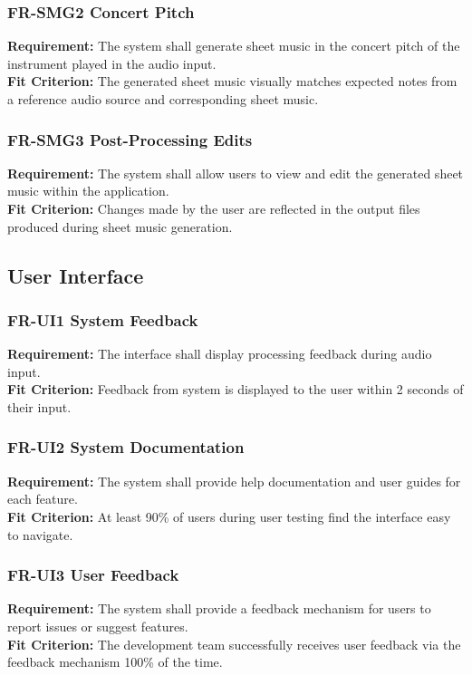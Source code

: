 \documentclass[12pt]{article}
\begin{document}
\subsubsection*{FR-SMG2 Concert Pitch} \label{FR-SMG2}
\textbf{Requirement:} The system shall generate sheet music in the concert pitch of the instrument played in the audio input. \\
\textbf{Fit Criterion:} The generated sheet music visually matches expected notes from a reference audio source and corresponding sheet music.
\subsubsection*{FR-SMG3 Post-Processing Edits} \label{FR-SMG3}
\textbf{Requirement:} The system shall allow users to view and edit the generated sheet music within the application. \\
\textbf{Fit Criterion:} Changes made by the user are reflected in the output files produced during sheet music generation.

\subsection{User Interface}
\subsubsection*{FR-UI1 System Feedback} \label{FR-UI1}
\textbf{Requirement:} The interface shall display processing feedback during audio input. \\
\textbf{Fit Criterion:} Feedback from system is displayed to the user within 2 seconds of their input.
\subsubsection*{FR-UI2 System Documentation} \label{FR-UI2}
\textbf{Requirement:} The system shall provide help documentation and user guides for each feature. \\
\textbf{Fit Criterion:} At least 90\% of users during user testing find the interface easy to navigate.
\subsubsection*{FR-UI3 User Feedback} \label{FR-UI3}
\textbf{Requirement:} The system shall provide a feedback mechanism for users to report issues or suggest features. \\
\textbf{Fit Criterion:} The development team successfully receives user feedback via the feedback mechanism 100\% of the time.
\end{document}
